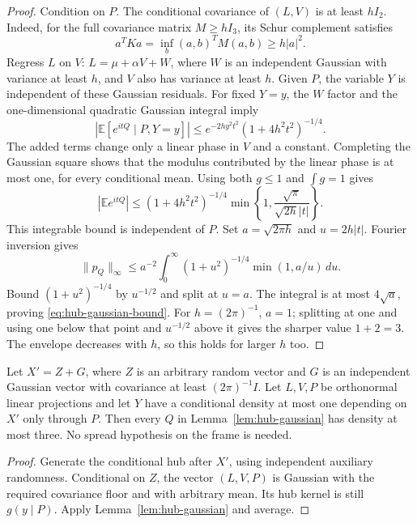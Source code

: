 \begin{proof}
Condition on $P$.  The conditional covariance of $(L,V)$ is at least
$hI_2$.  Indeed, for the full covariance matrix $M\ge hI_3$, its
Schur complement satisfies
\[
 a^TK a=\inf_b(a,b)^TM(a,b)\ge h|a|^2.
\]
Regress $L$ on $V$: $L=\mu+\alpha V+W$, where $W$ is an independent
Gaussian with variance at least $h$, and $V$ also has variance at
least $h$.  Given $P$, the variable $Y$ is independent of these
Gaussian residuals.  For fixed $Y=y$, the $W$ factor and the
one-dimensional quadratic Gaussian integral imply
\[
 |\mathbb E[e^{itQ}\mid P,Y=y]|
 \le e^{-2hy^2t^2}(1+4h^2t^2)^{-1/4}.
\]
The added terms change only a linear phase in $V$ and a constant.
Completing the Gaussian square shows that the modulus contributed by
the linear phase is at most one, for every conditional mean.
Using both $g\le1$ and $\int g=1$ gives
\begin{equation}\label{eq:hub-gaussian-envelope}
 |\mathbb E e^{itQ}|\le
 (1+4h^2t^2)^{-1/4}
       \min\left\{1,\frac{\sqrt\pi}{\sqrt{2h}|t|}\right\}.
\end{equation}
This integrable bound is independent of $P$.
Set $a=\sqrt{2\pi h}$ and $u=2h|t|$.  Fourier inversion gives
\[
 \|p_Q\|_\infty\le a^{-2}\int_0^\infty
             (1+u^2)^{-1/4}\min(1,a/u)\,du.
\]
Bound $(1+u^2)^{-1/4}$ by $u^{-1/2}$ and split at $u=a$.
The integral is at most $4\sqrt a$, proving
\eqref{eq:hub-gaussian-bound}.
For $h=(2\pi)^{-1}$, $a=1$; splitting at one and using one below
that point and $u^{-1/2}$ above it gives the sharper value $1+2=3$.
The envelope decreases with $h$, so this holds for larger $h$ too.
\end{proof}

\begin{corollary}\label{cor:hub-gaussian-floor}
Let $X'=Z+G$, where $Z$ is an arbitrary random vector and $G$ is an
independent Gaussian vector with covariance at least $(2\pi)^{-1}I$.
Let $L,V,P$ be orthonormal linear projections and let $Y$ have a
conditional density at most one depending on $X'$ only through $P$.
Then every $Q$ in Lemma~\ref{lem:hub-gaussian} has density at most
three.  No spread hypothesis on the frame is needed.
\end{corollary}

\begin{proof}
Generate the conditional hub after $X'$, using independent auxiliary
randomness.  Conditional on $Z$, the vector $(L,V,P)$ is Gaussian with
the required covariance floor and with arbitrary mean.  Its hub kernel
is still $g(y\mid P)$.  Apply Lemma~\ref{lem:hub-gaussian} and average.
\end{proof}

